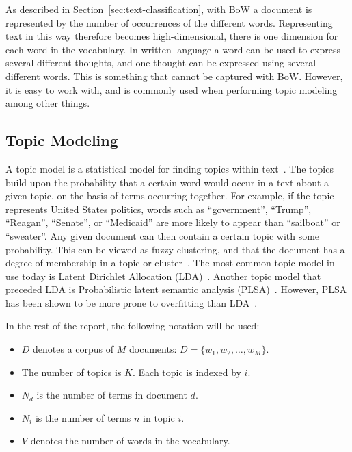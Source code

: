 As described in Section~\ref{sec:text-classification}, with BoW a document is represented by the number of occurrences of the different words. 
Representing text in this way therefore becomes high-dimensional, there is one dimension for each word in the vocabulary. 
In written language a word can be used to express several different thoughts, and one thought can be expressed using several different words.
This is something that cannot be captured with BoW.
However, it is easy to work with, and is commonly used when performing topic modeling among other things.

\subsection{Topic Modeling}\label{sec:topic-modeling}

A topic model is a statistical model for finding topics within text~\cite{crain2012dimensionality}.
The topics build upon the probability that a certain word would occur in a text about a given topic, on the basis of terms occurring together.
For example, if the topic represents United States politics, words such as ``government'', ``Trump'', ``Reagan'', ``Senate'', or ``Medicaid'' are more likely to appear than ``sailboat'' or ``sweater''.
Any given document can then contain a certain topic with some probability.
This can be viewed as fuzzy clustering, and that the document has a degree of membership in a topic or cluster~\cite{crain2012dimensionality}.
The most common topic model in use today is Latent Dirichlet Allocation (LDA)~\cite{crain2012dimensionality}.
Another topic model that preceded LDA is Probabilistic latent semantic analysis (PLSA)~\cite{hofmann1999probabilistic}.
However, PLSA has been shown to be more prone to overfitting than LDA~\cite{crain2012dimensionality}.

In the rest of the report, the following notation will be used:

\begin{itemize}
    \item $D$ denotes a corpus of $M$ documents: $D = \{w_1, w_2, \ldots, w_M\}$.
    \item The number of topics is $K$. Each topic is indexed by $i$.
    \item $N_d$ is the number of terms in document $d$.
    \item $N_i$ is the number of terms $n$ in topic $i$.
    \item $V$ denotes the number of words in the vocabulary.
\end{itemize}

